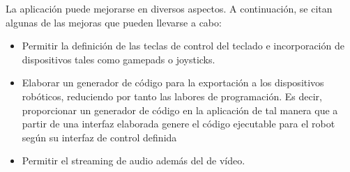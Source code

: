 La aplicación puede mejorarse en diversos aspectos. A continuación, se citan algunas de las mejoras que pueden llevarse a cabo:

\begin{itemize}

\item Permitir la definición de las teclas de control del teclado e incorporación de dispositivos tales como gamepads o joysticks.

\item Elaborar un generador de código para la exportación a los dispositivos robóticos, reduciendo por tanto las labores de programación. Es decir, proporcionar un generador de código
en la aplicación de tal manera que a partir de una interfaz elaborada genere el código ejecutable para el robot según su interfaz de control definida\\

\item Permitir el streaming de audio además del de vídeo.\\

\end{itemize}


